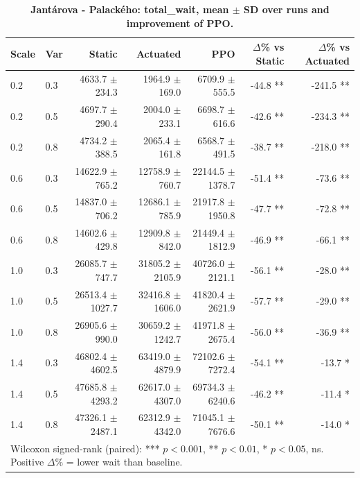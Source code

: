 \begin{table}
\caption{\textbf{Jantárova - Palackého: total\_wait, mean $\pm$ SD over runs and improvement of PPO.}}
\label{tab:stats_Jantárova_-_Palackého_total_wait}
\centering
\begin{tabular}{llrrrrr}
\hline
Scale & Var & Static & Actuated & PPO & $\Delta$\% vs Static & $\Delta$\% vs Actuated \\
\hline
0.2 & 0.3 & 4633.7 $\pm$ 234.3 & 1964.9 $\pm$ 169.0 & 6709.9 $\pm$ 555.5 & -44.8 ** & -241.5 ** \\
0.2 & 0.5 & 4697.7 $\pm$ 290.4 & 2004.0 $\pm$ 233.1 & 6698.7 $\pm$ 616.6 & -42.6 ** & -234.3 ** \\
0.2 & 0.8 & 4734.2 $\pm$ 388.5 & 2065.4 $\pm$ 161.8 & 6568.7 $\pm$ 491.5 & -38.7 ** & -218.0 ** \\
0.6 & 0.3 & 14622.9 $\pm$ 765.2 & 12758.9 $\pm$ 760.7 & 22144.5 $\pm$ 1378.7 & -51.4 ** & -73.6 ** \\
0.6 & 0.5 & 14837.0 $\pm$ 706.2 & 12686.1 $\pm$ 785.9 & 21917.8 $\pm$ 1950.8 & -47.7 ** & -72.8 ** \\
0.6 & 0.8 & 14602.6 $\pm$ 429.8 & 12909.8 $\pm$ 842.0 & 21449.4 $\pm$ 1812.9 & -46.9 ** & -66.1 ** \\
1.0 & 0.3 & 26085.7 $\pm$ 747.7 & 31805.2 $\pm$ 2105.9 & 40726.0 $\pm$ 2121.1 & -56.1 ** & -28.0 ** \\
1.0 & 0.5 & 26513.4 $\pm$ 1027.7 & 32416.8 $\pm$ 1606.0 & 41820.4 $\pm$ 2621.9 & -57.7 ** & -29.0 ** \\
1.0 & 0.8 & 26905.6 $\pm$ 990.0 & 30659.2 $\pm$ 1242.7 & 41971.8 $\pm$ 2675.4 & -56.0 ** & -36.9 ** \\
1.4 & 0.3 & 46802.4 $\pm$ 4602.5 & 63419.0 $\pm$ 4879.9 & 72102.6 $\pm$ 7272.4 & -54.1 ** & -13.7 * \\
1.4 & 0.5 & 47685.8 $\pm$ 4293.2 & 62617.0 $\pm$ 4307.0 & 69734.3 $\pm$ 6240.6 & -46.2 ** & -11.4 * \\
1.4 & 0.8 & 47326.1 $\pm$ 2487.1 & 62312.9 $\pm$ 4342.0 & 71045.1 $\pm$ 7676.6 & -50.1 ** & -14.0 * \\
\hline
\multicolumn{7}{l}{\footnotesize Wilcoxon signed-rank (paired): *** $p<0.001$, ** $p<0.01$, * $p<0.05$, ns. Positive $\Delta$\% = lower wait than baseline.} \\
\end{tabular}
\end{table}
